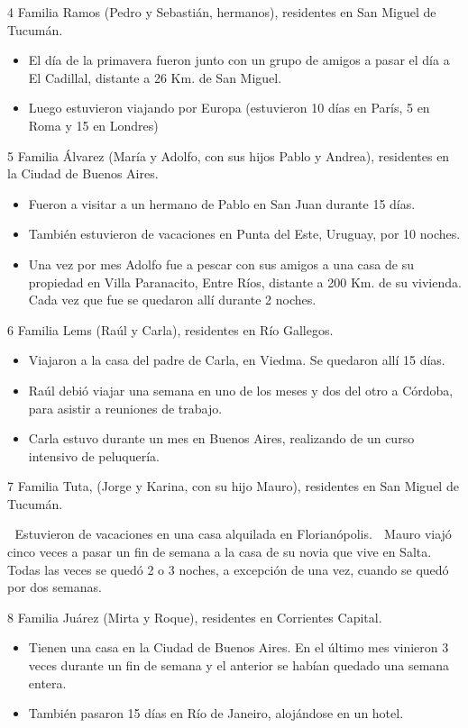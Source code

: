 \documentclass[
  openany]{book}
\begin{document}
4 Familia Ramos (Pedro y Sebastián, hermanos), residentes en San Miguel de Tucumán.

\begin{itemize}
\item
  El día de la primavera fueron junto con un grupo de amigos a pasar el día a El Cadillal, distante a 26 Km. de San Miguel.
\item
  Luego estuvieron viajando por Europa (estuvieron 10 días en París, 5 en Roma y 15 en Londres)
\end{itemize}

5 Familia Álvarez (María y Adolfo, con sus hijos Pablo y Andrea), residentes en la Ciudad de Buenos Aires.

\begin{itemize}
\item
  Fueron a visitar a un hermano de Pablo en San Juan durante 15 días.
\item
  También estuvieron de vacaciones en Punta del Este, Uruguay, por 10 noches.
\item
  Una vez por mes Adolfo fue a pescar con sus amigos a una casa de su propiedad en Villa Paranacito, Entre Ríos, distante a 200 Km. de su vivienda. Cada vez que fue se quedaron allí durante 2 noches.
\end{itemize}

6 Familia Lems (Raúl y Carla), residentes en Río Gallegos.

\begin{itemize}
\item
  Viajaron a la casa del padre de Carla, en Viedma. Se quedaron allí 15 días.
\item
  Raúl debió viajar una semana en uno de los meses y dos del otro a Córdoba, para asistir a reuniones de trabajo.
\item
  Carla estuvo durante un mes en Buenos Aires, realizando de un curso intensivo de peluquería.
\end{itemize}

7 Familia Tuta, (Jorge y Karina, con su hijo Mauro), residentes en San Miguel de Tucumán.

 Estuvieron de vacaciones en una casa alquilada en Florianópolis.  Mauro viajó cinco veces a pasar un fin de semana a la casa de su novia que vive en Salta. Todas las veces se quedó 2 o 3 noches, a excepción de una vez, cuando se quedó por dos semanas.

8 Familia Juárez (Mirta y Roque), residentes en Corrientes Capital.

\begin{itemize}
\item
  Tienen una casa en la Ciudad de Buenos Aires. En el último mes vinieron 3 veces durante un fin de semana y el anterior se habían quedado una semana entera.
\item
  También pasaron 15 días en Río de Janeiro, alojándose en un hotel.
\end{itemize}
\end{document}
